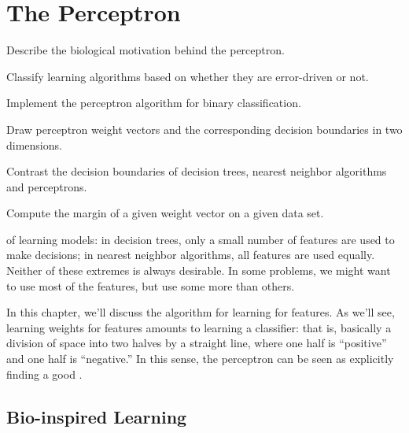 \chapter{The Perceptron} \label{sec:perc}

\chapterquote{}{}


\begin{learningobjectives}
\item Describe the biological motivation behind the perceptron.
\item Classify learning algorithms based on whether they are
  error-driven or not.
\item Implement the perceptron algorithm for binary classification.
\item Draw perceptron weight vectors and the corresponding decision
  boundaries in two dimensions.
\item Contrast the decision boundaries of decision trees, nearest
  neighbor algorithms and perceptrons.
\item Compute the margin of a given weight vector on a given data set.
\end{learningobjectives}


 of learning models: in
decision trees, only a small number of features are used to make
decisions; in nearest neighbor algorithms, all features are used
equally.  Neither of these extremes is always desirable.  In some
problems, we might want to use most of the features, but use some more
than others.

In this chapter, we'll discuss the  algorithm for
learning  for features.  As we'll see, learning
weights for features amounts to learning a 
classifier: that is, basically a division of space into two halves by
a straight line, where one half is ``positive'' and one half is
``negative.''  In this sense, the perceptron can be seen as explicitly
finding a good .

\section{Bio-inspired Learning}


